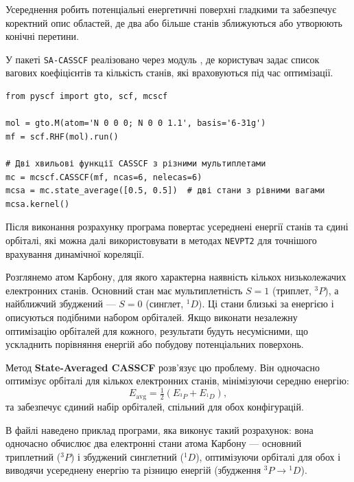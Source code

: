 Усереднення робить потенціальні енергетичні поверхні гладкими та
забезпечує коректний опис областей, де два або більше станів зближуються
або утворюють конічні перетини.


У пакеті \PySCF{} \texttt{SA-CASSCF} реалізовано через модуль
, де користувач задає список вагових коефіцієнтів
та кількість станів, які враховуються під час оптимізації.

\begin{verbatim}
from pyscf import gto, scf, mcscf

mol = gto.M(atom='N 0 0 0; N 0 0 1.1', basis='6-31g')
mf = scf.RHF(mol).run()

# Дві хвильові функції CASSCF з різними мультиплетами
mc = mcscf.CASSCF(mf, ncas=6, nelecas=6)
mcsa = mc.state_average([0.5, 0.5])  # дві стани з рівними вагами
mcsa.kernel()
\end{verbatim}
Після виконання розрахунку програма повертає усереднені енергії станів
та єдині орбіталі, які можна далі використовувати в методах
\texttt{NEVPT2} для точнішого врахування динамічної кореляції.

Розглянемо атом Карбону, для якого характерна наявність кількох
низьколежачих електронних станів. Основний стан має мультиплетність
\(S = 1\) (триплет, \(^{3}P\)), а найближчий збуджений --- \(S = 0\)
(синглет, \(^{1}D\)). Ці стани близькі за енергією і описуються подібними
набором орбіталей. Якщо виконати незалежну оптимізацію орбіталей для кожного,
результати будуть несумісними, що ускладнить порівняння енергій або побудову
потенціальних поверхонь.

Метод \textbf{State-Averaged CASSCF} розв’язує цю проблему.
Він одночасно оптимізує орбіталі для кількох електронних станів,
мінімізуючи середню енергію:
\[
E_{\text{avg}} = \tfrac{1}{2}(E_{^{3}P} + E_{^{1}D}),
\]
та забезпечує єдиний набір орбіталей, спільний для обох конфігурацій.

В файлі  наведено приклад програми, яка виконує такий розрахунок:
вона одночасно обчислює два електронні стани атома Карбону ---
основний триплетний (\(^{3}P\)) і збуджений синглетний (\(^{1}D\)),
оптимізуючи орбіталі для обох і виводячи усереднену енергію
та різницю енергій (збудження \(^{3}P \rightarrow {}^{1}D\)).




